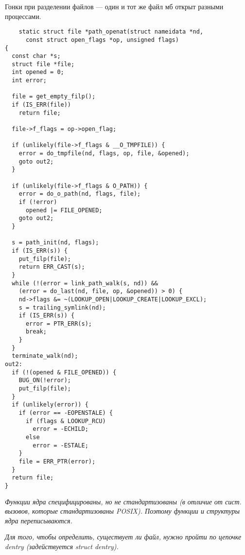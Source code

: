 Гонки при разделении файлов --- один и тот же файл мб открыт разными процессами.

\begin{lstlisting}
    static struct file *path_openat(struct nameidata *nd,
      const struct open_flags *op, unsigned flags)
{
  const char *s;
  struct file *file;
  int opened = 0;
  int error;

  file = get_empty_filp();
  if (IS_ERR(file))
    return file;

  file->f_flags = op->open_flag;

  if (unlikely(file->f_flags & __O_TMPFILE)) {
    error = do_tmpfile(nd, flags, op, file, &opened);
    goto out2;
  }

  if (unlikely(file->f_flags & O_PATH)) {
    error = do_o_path(nd, flags, file);
    if (!error)
      opened |= FILE_OPENED;
    goto out2;
  }

  s = path_init(nd, flags);
  if (IS_ERR(s)) {
    put_filp(file);
    return ERR_CAST(s);
  }
  while (!(error = link_path_walk(s, nd)) &&
    (error = do_last(nd, file, op, &opened)) > 0) {
    nd->flags &= ~(LOOKUP_OPEN|LOOKUP_CREATE|LOOKUP_EXCL);
    s = trailing_symlink(nd);
    if (IS_ERR(s)) {
      error = PTR_ERR(s);
      break;
    }
  }
  terminate_walk(nd);
out2:
  if (!(opened & FILE_OPENED)) {
    BUG_ON(!error);
    put_filp(file);
  }
  if (unlikely(error)) {
    if (error == -EOPENSTALE) {
      if (flags & LOOKUP_RCU)
        error = -ECHILD;
      else
        error = -ESTALE;
    }
    file = ERR_PTR(error);
  }
  return file;
}

\end{lstlisting}

\textit{
Функции ядра специфицированы, но не стандартизованы (в отличие от сист. вызовов, которые стандартизованы POSIX). Поэтому функции и структуры ядра переписываются.}

\textit{
Для того, чтобы определить, существует ли файл, нужно пройти по цепочке dentry (задействуется struct dentry).}







